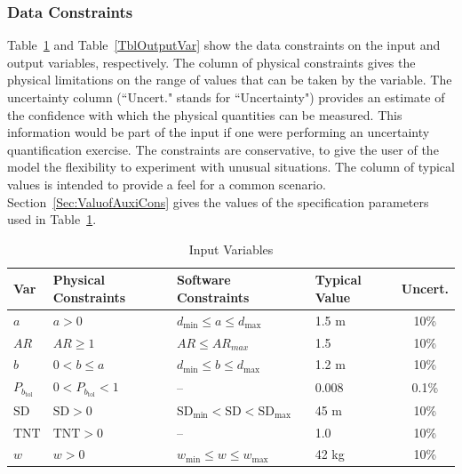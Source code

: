 \documentclass[12pt]{article}
\begin{document}
\subsubsection{Data Constraints} \label{sec_DataConstraints}

Table~\ref{TblInputVar} and Table~\ref{TblOutputVar} show the data constraints on the input and output variables, respectively.  The
column of physical constraints gives the physical limitations on the range of
values that can be taken by the variable. The uncertainty column (``Uncert." stands for ``Uncertainty") provides an estimate of the confidence
with which the physical quantities can be measured.  This information would be
part of the input if one were performing an uncertainty quantification exercise. The constraints are conservative, to
give the user of the model the flexibility to experiment with unusual
situations.  The column of typical values is intended to provide a feel for a
common scenario.
Section~\ref{Sec:ValuofAuxiCons} gives the values of the specification parameters used
in Table~\ref{TblInputVar}.

\begin{table}[!h]
\caption{Input Variables} \label{TblInputVar}
\renewcommand{\arraystretch}{1.2}
\begin{tabular}{l l l l c} 
\toprule
\textbf{Var} & \textbf{Physical Constraints} & \textbf{Software Constraints} & \textbf{Typical Value} & \textbf{Uncert.} \\
\midrule 
$a$&$a > 0 $ & $d_{\text{min}} \leq a \leq d_{\text{max}}$ 
                           & 1.5 \si[per-mode=symbol] {\metre}& 10\%\\

$AR$& $AR \geq 1$ & $AR \leq AR_{max}$ & 1.5 & 10\%\\
                           
$b$&$0 < b \leq a$ & $d_{\text{min}} \leq b \leq d_{\text{max}}$ 
                           & 1.2 \si[per-mode=symbol]{\metre}& 10\%\\
                           
$P_{b_{\text{tol}}}$& $0 < P_{b_{\text{tol}}} < 1$& --& 0.008 &0.1\%\\

$\text{SD}$&$\text{SD}>0$&$\text{SD}_{\text{min}}<\text{SD}<\text{SD}_{\text{max}}$&45
\si[per-mode=symbol]{\meter}&10\%\\

$\text{TNT}$&$\text{TNT}>0$&--&1.0&10\%\\


$w$&$w > 0$ & $w_{\text{min}} \le w \le w_{\text{max}}$&42 \si[per-mode=symbol]{\kilo\gram}&10\%\\

\bottomrule
\end{tabular}
\end{table}
\end{document}
